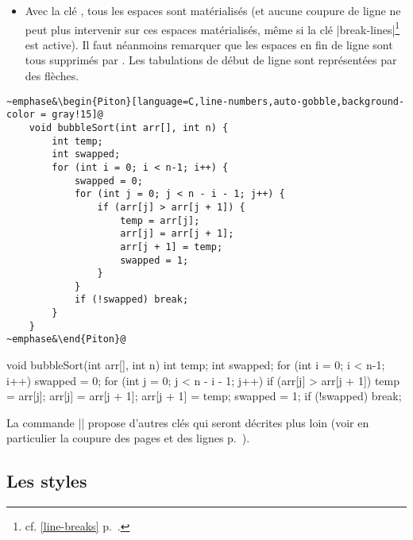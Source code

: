 \documentclass[dvipsnames,svgnames]{article}
\begin{document}
\begin{itemize}
\item {} Avec la clé , tous les espaces sont
matérialisés (et aucune coupure de ligne ne peut plus intervenir sur ces espaces
matérialisés, même si la clé |break-lines|\footnote{cf. \ref{line-breaks}
  p.~\pageref{line-breaks}.} est active). Il faut néanmoins remarquer que les espaces en
fin de ligne sont tous supprimés par . Les tabulations de début de ligne sont
représentées par des flèches.
\end{itemize}

\bigskip

\begingroup
{}
\begin{Verbatim}
~emphase&\begin{Piton}[language=C,line-numbers,auto-gobble,background-color = gray!15]@
    void bubbleSort(int arr[], int n) {
        int temp;
        int swapped;
        for (int i = 0; i < n-1; i++) {
            swapped = 0;
            for (int j = 0; j < n - i - 1; j++) {
                if (arr[j] > arr[j + 1]) {
                    temp = arr[j];
                    arr[j] = arr[j + 1];
                    arr[j + 1] = temp;
                    swapped = 1; 
                }
            }
            if (!swapped) break;
        }
    }   
~emphase&\end{Piton}@
\end{Verbatim}
\endgroup


\begin{Piton}[language=C,line-numbers,auto-gobble,background-color = gray!15]
    void bubbleSort(int arr[], int n) {
        int temp;
        int swapped;
        for (int i = 0; i < n-1; i++) {
            swapped = 0;
            for (int j = 0; j < n - i - 1; j++) {
                if (arr[j] > arr[j + 1]) {
                    temp = arr[j];
                    arr[j] = arr[j + 1];
                    arr[j + 1] = temp;
                    swapped = 1; 
                }
            }
            if (!swapped) break;
        }
    }   
\end{Piton}




\bigskip
La commande |\PitonOptions| propose d'autres clés qui seront décrites plus loin (voir en
particulier la coupure des pages et des lignes p.~\pageref{breakable}).



\subsection{Les styles}
\end{document}
